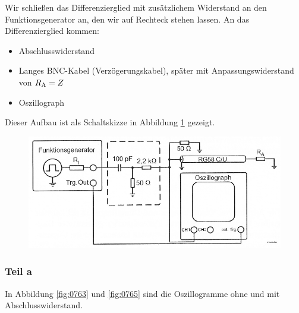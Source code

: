 Wir schließen das Differenzierglied mit zusätzlichem Widerstand an den
Funktionsgenerator an, den wir auf Rechteck stehen lassen. An das
Differenzierglied kommen:
%
\begin{itemize}
	\item
		Abschlusswiderstand
	\item
		Langes BNC-Kabel (Verzögerungskabel), später mit Anpassungswiderstand
		von $R_\text A = Z$
	\item
		Oszillograph
\end{itemize}

Dieser Aufbau ist als Schaltskizze in Abbildung \ref{fig:1-8} gezeigt.

\begin{figure}
	\centering
	\includegraphics[width=\textwidth]{Schaltplan/1-8.png}
	\caption{%
		\cite[Abbildung~1.8]{physik313-Anleitung}
	}
	\label{fig:1-8}
\end{figure}


\FloatBarrier
\subsubsection{Teil a}

In Abbildung \ref{fig:0763} und \ref{fig:0765} sind die Oszillogramme ohne und
mit Abschlusswiderstand.

